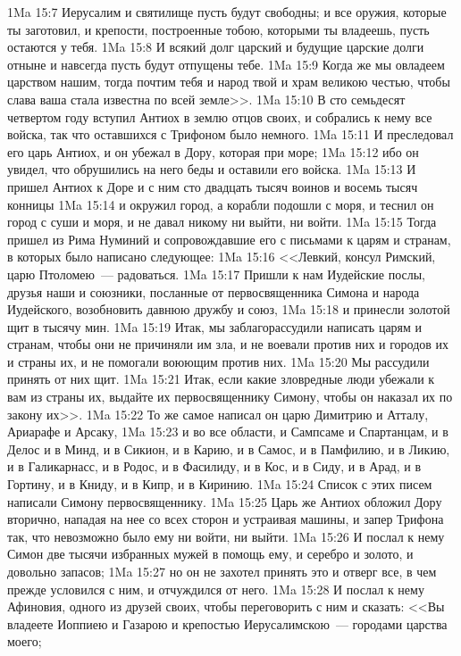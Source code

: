 \vs 1Ma 15:7 Иерусалим и святилище пусть будут свободны; и все оружия, которые ты заготовил, и крепости, построенные тобою, которыми ты владеешь, пусть остаются у тебя.
\vs 1Ma 15:8 И всякий долг царский и будущие царские долги отныне и навсегда пусть будут отпущены тебе.
\vs 1Ma 15:9 Когда же мы овладеем царством нашим, тогда почтим тебя и народ твой и храм великою честью, чтобы слава ваша стала известна по всей земле>>.
\rsbpar\vs 1Ma 15:10 В сто семьдесят четвертом году вступил Антиох в землю отцов своих, и собрались к нему все войска, так что оставшихся с Трифоном было немного.
\vs 1Ma 15:11 И преследовал его царь Антиох, и он убежал в Дору, которая при море;
\vs 1Ma 15:12 ибо он увидел, что обрушились на него беды и оставили его войска.
\vs 1Ma 15:13 И пришел Антиох к Доре и с ним сто двадцать тысяч воинов и восемь тысяч конницы
\vs 1Ma 15:14 и окружил город, а корабли подошли с моря, и теснил он город с суши и моря, и не давал никому ни выйти, ни войти.
\rsbpar\vs 1Ma 15:15 Тогда пришел из Рима Нуминий и сопровождавшие его с письмами к царям и странам, в которых было написано следующее:
\vs 1Ma 15:16 <<Левкий, консул Римский, царю Птоломею~--- радоваться.
\vs 1Ma 15:17 Пришли к нам Иудейские послы, друзья наши и союзники, посланные от первосвященника Симона и народа Иудейского, возобновить давнюю дружбу и союз,
\vs 1Ma 15:18 и принесли золотой щит в тысячу мин.
\vs 1Ma 15:19 Итак, мы заблагорассудили написать царям и странам, чтобы они не причиняли им зла, и не воевали против них и городов их и страны их, и не помогали воюющим против них.
\vs 1Ma 15:20 Мы рассудили принять от них щит.
\vs 1Ma 15:21 Итак, если какие зловредные люди убежали к вам из страны их, выдайте их первосвященнику Симону, чтобы он наказал их по закону их>>.
\vs 1Ma 15:22 То же самое написал он царю Димитрию и Атталу, Ариарафе и Арсаку,
\vs 1Ma 15:23 и во все области, и Сампсаме и Спартанцам, и в Делос и в Минд, и в Сикион, и в Карию, и в Самос, и в Памфилию, и в Ликию, и в Галикарнасс, и в Родос, и в Фасилиду, и в Кос, и в Сиду, и в Арад, и в Гортину, и в Книду, и в Кипр, и в Киринию.
\vs 1Ma 15:24 Список с этих писем написали Симону первосвященнику.
\rsbpar\vs 1Ma 15:25 Царь же Антиох обложил Дору вторично, нападая на нее со всех сторон и устраивая машины, и запер Трифона так, что невозможно было ему ни войти, ни выйти.
\vs 1Ma 15:26 И послал к нему Симон две тысячи избранных мужей в помощь ему, и серебро и золото, и довольно запасов;
\vs 1Ma 15:27 но он не захотел принять это и отверг все, в чем прежде условился с ним, и отчуждился от него.
\vs 1Ma 15:28 И послал к нему Афиновия, одного из друзей своих, чтобы переговорить с ним и сказать: <<Вы владеете Иоппиею и Газарою и крепостью Иерусалимскою~--- городами царства моего;
